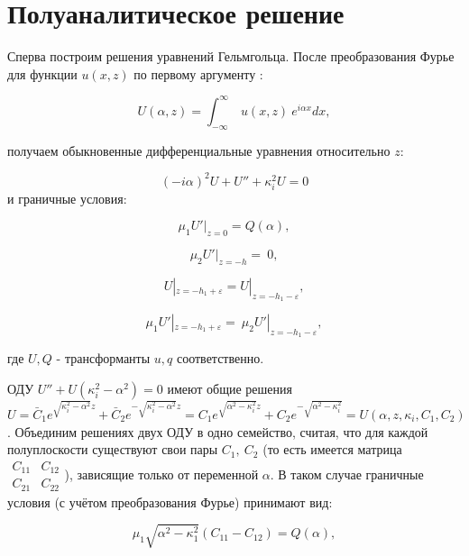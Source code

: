 \documentclass[a4paper, 12pt]{article}
\begin{document}
\section{Полуаналитическое решение}
Сперва построим решения уравнений Гельмгольца. После преобразования Фурье для функции $u(x,z)$ по первому аргументу \cite{g90}:

\begin{equation}
    U(\alpha,z)=\int_{-\infty}^{\infty}\ u(x,z) \ e^{i\alpha x} dx,
\end{equation}

получаем обыкновенные дифференциальные уравнения относительно $z$:

$$(-i\alpha)^2 U+U''+\kappa_i^2U=0$$
и граничные условия:

\begin{equation}
   \mu_1 U'|_{z=0}=Q(\alpha), 
\end{equation}

\begin{equation}
    \mu_2  U'|_{z=-h}=\ 0,
\end{equation}

\begin{equation}
    U|_{z=-h_1+\varepsilon}=U|_{z=-h_1-\varepsilon},
\end{equation}

\begin{equation}
    \mu_1  U'|_{z=-h_1+\varepsilon}=\ \mu_2  U'|_{z=-h_1-\varepsilon},
\end{equation}

где $U, Q$ - трансформанты $u, q$ соответственно.

ОДУ $U'' +U (\kappa_i^2-\alpha^2)=0$ имеют общие решения $U=\bar C_1 e^{\sqrt{\kappa_i^2-\alpha^2} z} + \bar C_2 e^{-\sqrt{\kappa_i^2-\alpha^2} z}=C_1 e^{\sqrt{\alpha^2-\kappa_i^2} z} + C_2e^{-\sqrt{\alpha^2-\kappa_i^2}}=U(\alpha,z,\kappa_i,C_1,C_2)$. Объединим решениях двух ОДУ в одно семейство, считая, что для каждой полуплоскости существуют свои пары $C_1,\ C_2$ (то есть имеется матрица $\begin{matrix} C_{11} & C_{12} \\ C_{21} & C_{22} \end{matrix}$), зависящие только от переменной $\alpha$. В таком случае граничные условия (с учётом преобразования Фурье) принимают вид:

    \begin{equation}
    \mu_1 \sqrt{\alpha^2-\kappa_1^2} (C_{11}-C_{12})=Q(\alpha),
    \end{equation}   
\end{document}
